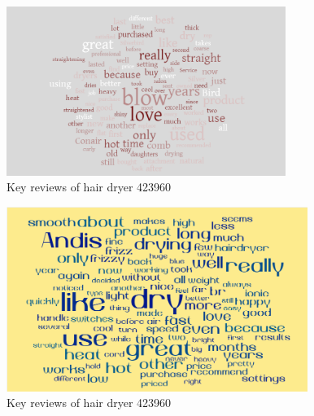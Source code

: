 \documentclass{mcmthesis}
\begin{document}
\begin{appendices}
\begin{figure}[H] 
\centering
\includegraphics[width=.9\textwidth,height=5.5cm]{figures/yun2.png}
\caption{Key reviews of hair dryer 423960}
\end{figure}

\begin{figure}[H] 
\centering
\includegraphics[width=.9\textwidth,height=6cm]{figures/yun3.png}
\caption{Key reviews of hair dryer 423960}
\end{figure}





%
\end{appendices}
\end{document}
